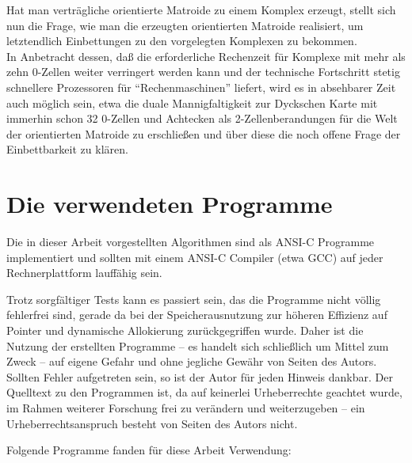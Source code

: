 Hat man verträgliche orientierte Matroide zu einem Komplex erzeugt,
stellt sich nun die Frage, wie man die erzeugten orientierten Matroide
realisiert, um letztendlich Einbettungen zu den vorgelegten Komplexen zu
bekommen.\\
In Anbetracht dessen, daß die erforderliche Rechenzeit für Komplexe mit mehr
als zehn 0-Zellen weiter verringert werden kann und der technische
Fortschritt stetig schnellere Prozessoren für "`Rechenmaschinen"' liefert,
wird es in absehbarer Zeit auch möglich sein, etwa die duale
Mannigfaltigkeit zur Dyckschen Karte mit immerhin schon 32 0-Zellen und
Achtecken als 2-Zellenberandungen für die Welt der orientierten Matroide zu
erschließen und über diese die noch offene Frage der Einbettbarkeit zu
klären.

\section{Die verwendeten Programme}

Die in dieser Arbeit vorgestellten Algorithmen sind als ANSI-C Programme
implementiert und sollten mit einem ANSI-C Compiler (etwa GCC) auf jeder
Rechnerplattform lauffähig sein.

Trotz sorgfältiger Tests kann es passiert sein, das die Programme nicht
völlig fehlerfrei sind, gerade da bei der Speicherausnutzung zur höheren
Effizienz auf Pointer und dynamische Allokierung zurückgegriffen wurde.
Daher ist die Nutzung der erstellten Programme -- es handelt sich
schließlich um Mittel zum Zweck -- auf eigene Gefahr und ohne jegliche
Gewähr von Seiten des Autors. Sollten Fehler aufgetreten sein, so ist
der Autor für jeden Hinweis dankbar. Der Quelltext zu den Programmen
ist, da auf keinerlei Urheberrechte geachtet wurde, im Rahmen weiterer
Forschung frei zu verändern und weiterzugeben -- ein Urheberrechtsanspruch
besteht von Seiten des Autors nicht.

Folgende Programme fanden für diese Arbeit Verwendung:


